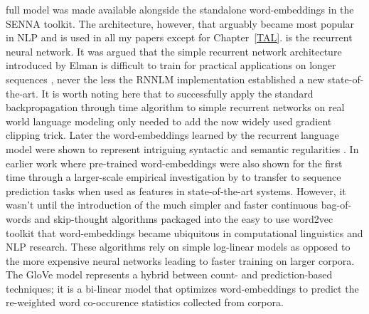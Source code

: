 full model was made available alongside the standalone word-embeddings in the SENNA toolkit.
The architecture, however, that arguably became most popular in NLP and is used in all my papers except
for Chapter~\ref{TAL}. is the recurrent neural network. It was argued that the simple recurrent network
architecture introduced by Elman is difficult to train for practical applications on longer sequences
\cite{bengio1994learning}, never the less the RNNLM implementation \cite{mikolov2010recurrent} established
a new state-of-the-art. It is worth noting here that to successfully
apply the standard backpropagation through time algorithm  \cite{williams1995gradient} to simple recurrent
networks on real world language modeling \cite{mikolov2012statistical} only needed to add the now
widely used gradient clipping trick. Later the word-embeddings learned by the recurrent language model were
shown to represent intriguing syntactic and semantic regularities \cite{mikolov2013linguistic} .
In earlier work where pre-trained word-embeddings were also shown for the first time through a
larger-scale empirical investigation by \cite{turian2010word} to transfer to sequence prediction tasks
when used as features in state-of-the-art systems.
However, it wasn't until the introduction of the much simpler and faster continuous bag-of-words and skip-thought
algorithms \cite{mikolov2013efficient} packaged into the easy to use word2vec toolkit that
word-embeddings became ubiquitous in computational linguistics and NLP research.
These algorithms rely on simple log-linear models as opposed to the more expensive
neural networks leading to faster training on larger corpora. The GloVe \cite{pennington2014glove}
model represents a hybrid between count- and prediction-based techniques;
it is a bi-linear model that optimizes word-embeddings to predict the re-weighted
word co-occurence statistics collected from corpora.

